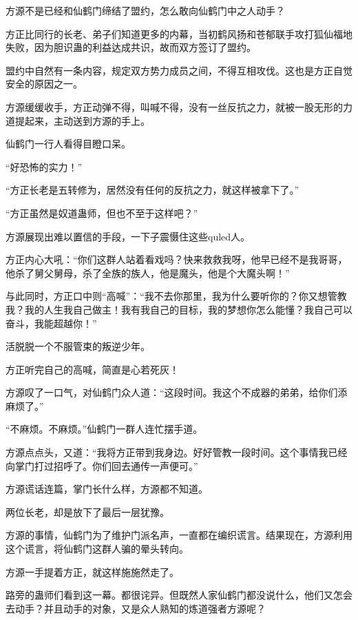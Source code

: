 
\begin{this_body}

方源不是已经和仙鹤门缔结了盟约，怎么敢向仙鹤门中之人动手？

方正比同行的长老、弟子们知道更多的内幕，当初鹤风扬和苍郁联手攻打狐仙福地失败，因为胆识蛊的利益达成共识，故而双方签订了盟约。

盟约中自然有一条内容，规定双方势力成员之间，不得互相攻伐。这也是方正自觉安全的原因之一。

方源缓缓收手，方正动弹不得，叫喊不得，没有一丝反抗之力，就被一股无形的力道提起来，主动送到方源的手上。

仙鹤门一行人看得目瞪口呆。

“好恐怖的实力！”

“方正长老是五转修为，居然没有任何的反抗之力，就这样被拿下了。”

“方正虽然是奴道蛊师，但也不至于这样吧？”

方源展现出难以置信的手段，一下子震慑住这些quled人。

方正内心大吼：“你们这群人站着看戏吗？快来救救我呀，他早已经不是我哥哥，他杀了舅父舅母，杀了全族的族人，他是魔头，他是个大魔头啊！”

与此同时，方正口中则“高喊”：“我不去你那里，我为什么要听你的？你又想管教我？我的人生我自己做主！我有我自己的目标，我的梦想你怎么能懂？我自己可以奋斗，我能超越你！”

活脱脱一个不服管束的叛逆少年。

方正听完自己的高喊，简直是心若死灰！

方源叹了一口气，对仙鹤门众人道：“这段时间。我这个不成器的弟弟，给你们添麻烦了。”

“不麻烦。不麻烦。”仙鹤门一群人连忙摆手道。

方源点点头，又道：“我将方正带到我身边。好好管教一段时间。这个事情我已经向掌门打过招呼了。你们回去通传一声便可。”

方源谎话连篇，掌门长什么样，方源都不知道。

两位长老，却是放下了最后一层犹豫。

方源的事情，仙鹤门为了维护门派名声，一直都在编织谎言。结果现在，方源利用这个谎言，将仙鹤门这群人骗的晕头转向。

方源一手提着方正，就这样施施然走了。

路旁的蛊师们看到这一幕。都很诧异。但既然人家仙鹤门都没说什么，他们又怎会去动手？并且动手的对象，又是众人熟知的炼道强者方源呢？


\end{this_body}
